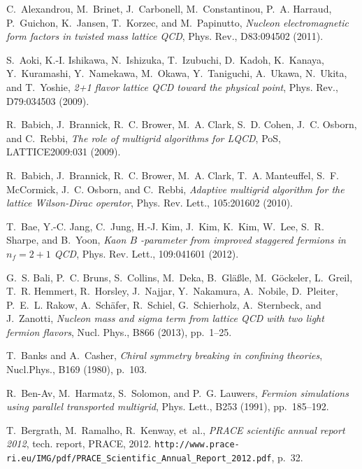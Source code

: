 \documentclass{siamltex}
\begin{document}

\begin{thebibliography}{10}

  {\sc C.~Alexandrou, M.~Brinet, J.~Carbonell, M.~Constantinou, P.~A. Harraud,
    P.~Guichon, K.~Jansen, T.~Korzec, and M.~Papinutto}, {\em Nucleon
      electromagnetic form factors in twisted mass lattice {QCD}}, Phys. Rev.,
  D83:094502 (2011).

  {\sc S.~Aoki, K.-I. Ishikawa, N.~Ishizuka, T.~Izubuchi, D.~Kadoh, K.~Kanaya,
    Y.~Kuramashi, Y.~Namekawa, M.~Okawa, Y.~Taniguchi, A.~Ukawa, N.~Ukita, and
    T.~Yoshie}, {\em 2+1 flavor lattice {QCD} toward the physical point}, Phys.
  Rev., D79:034503 (2009).

  {\sc R.~Babich, J.~Brannick, R.~C. Brower, M.~A. Clark, S.~D. Cohen, J.~C.
    Osborn, and C.~Rebbi}, {\em The role of multigrid algorithms for {LQCD}},
  PoS, LATTICE2009:031 (2009).

  {\sc R.~Babich, J.~Brannick, R.~C. Brower, M.~A. Clark, T.~A. Manteuffel, S.~F.
    McCormick, J.~C. Osborn, and C.~Rebbi}, {\em Adaptive multigrid algorithm for
  the lattice {W}ilson-{D}irac operator}, Phys. Rev. Lett., 105:201602 (2010).

  {\sc T.~Bae, Y.-C. Jang, C.~Jung, H.-J. Kim, J.~Kim, K.~Kim, W.~Lee, S.~R.
    Sharpe, and B.~Yoon}, {\em Kaon {        $B$        }-parameter from improved staggered
      fermions in         $n_f=2+1$         {QCD}}, Phys. Rev. Lett., 109:041601 (2012).

  {\sc G.~S. Bali, P.~C. Bruns, S.~Collins, M.~Deka, B.~Gl{\"{a}}{\ss}le,
  M.~G{\"{o}}ckeler, L.~Greil, T.~R. Hemmert, R.~Horsley, J.~Najjar, Y.~Nakamura,
  A.~Nobile, D.~Pleiter, P.~E.~L. Rakow, A.~Sch{\"{a}}fer, R.~Schiel,
  G.~Schierholz, A.~Sternbeck, and J.~Zanotti}, {\em Nucleon mass and sigma
      term from lattice {QCD} with two light fermion flavors}, Nucl. Phys., B866
  (2013), pp.~1--25.

  {\sc T.~Banks and A.~Casher}, {\em Chiral symmetry breaking in confining
      theories}, Nucl.Phys., B169 (1980), p.~103.

  {\sc R.~Ben-Av, M.~Harmatz, S.~Solomon, and P.~G. Lauwers}, {\em Fermion
      simulations using parallel transported multigrid}, Phys. Lett., B253 (1991),
  pp.~185--192.

  {\sc T.~Bergrath, M.~Ramalho, R.~Kenway, et~al.}, {\em {PRACE} scientific
      annual report 2012}, tech. report, PRACE, 2012.
  \newblock
  \texttt{http://www.prace-ri.eu/IMG/pdf/PRACE\_Scientific\_Annual\_Report\_2012.pdf},
  p.~32.


\end{thebibliography}
\end{document}
